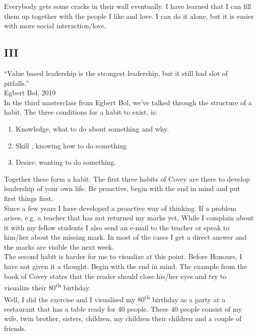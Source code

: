 \documentclass{article}
\begin{document}
Everybody gets some cracks in their wall eventually. I have learned that I can fill them up together with the people I like and love. I can do it alone, but it is easier with more social interaction/love. \\

\subsection{III}
``Value based leadership is the strongest leadership, but it still had slot of pitfalls.''\\
Egbert Bol, 2019\\

In the third masterclass from Egbert Bol, we've talked through the structure of a habit. The three conditions for a habit to exist, is:
\begin{enumerate}
	\item Knowledge, what to do about something  and why.
	\item Skill , knowing how to do something
	\item Desire, wanting to do something.	
	\end{enumerate} 
Together these form a habit. The first three habits of Covey are there to develop leadership of your own life. Be proactive, begin with the end in mind and put first things first. \\

Since a few years I have developed a proactive way of thinking. If a problem arises, e.g. a teacher that has not returned my marks yet. While I complain about it with my fellow students I also send an e-mail to the teacher or speak to him/her about the missing mark. In most of the cases I get a direct answer and the marks are visible the next week. \\

The second habit is harder for me to visualize at this point. Before Honours, I have not given it a thought. Begin with the end in mind. The example from the book of Covey states that the reader should close his/her eyes and try to visualize their 80\textsuperscript{th} birthday.\\

Well, I did the exercise and I visualised my 80\textsuperscript{th} birthday as a party at a restaurant that has a table ready for 40 people. These 40 people consist of my wife, twin brother, sisters, children, my children their children and a couple of friends. \\
\end{document}
